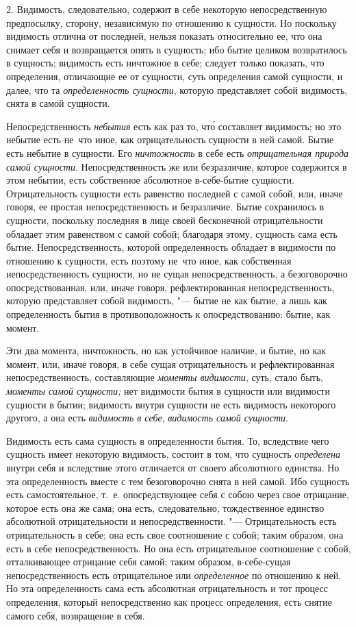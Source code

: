 2. Видимость, следовательно, содержит в себе некоторую непосредственную
предпосылку, сторону, независимую по отношению к сущности. Но поскольку
видимость отлична от последней, нельзя показать относительно ее, что она
снимает себя и возвращается опять в сущность; ибо бытие целиком
возвратилось в сущность; видимость есть ничтожное в себе; следует только
показать, что определения, отличающие ее от сущности, суть определения
самой сущности, и далее, что та {\em определенность
сущности}, которую представляет собой видимость, снята в самой сущности.

Непосредственность {\em небытия} есть как раз то, чт\'{о}
составляет видимость; но это небытие есть не~что иное, как отрицательность
сущности в ней самой. Бытие есть небытие в сущности. Его
{\em ничтожность} в себе есть
{\em отрицательная природа самой сущности}.
Непосредственность же или безразличие, которое содержится в этом небытии,
есть собственное абсолютное в-себе-бытие сущности. Отрицательность сущности
есть равенство последней с самой собой, или, иначе говоря, ее простая
непосредственность и безразличие. Бытие сохранилось в сущности, поскольку
последняя в лице своей бесконечной отрицательности обладает этим равенством
с самой собой; благодаря этому, сущность сама есть бытие.
Непосредственность, которой определенность обладает в видимости по
отношению к сущности, есть поэтому не~что иное, как собственная
непосредственность сущности, но не сущая непосредственность, а
безоговорочно опосредствованная, или, иначе говоря, рефлектированная
непосредственность, которую представляет собой видимость, "--- бытие не как
бытие, а лишь как определенность бытия в противоположность к
опосредствованию: бытие, как момент.

Эти два момента, ничтожность, но как устойчивое наличие, и бытие, но как
момент, или, иначе говоря, в себе сущая отрицательность и рефлектированная
непосредственность, составляющие {\em моменты
видимости}, суть, стало быть, {\em моменты самой
сущности;} нет видимости бытия в сущности или видимости сущности в бытии;
видимость внутри сущности не есть видимость некоторого другого, а она есть
{\em видимость в себе},
{\em видимость самой сущности}.

Видимость есть сама сущность в определенности бытия. То, вследствие чего
сущность имеет некоторую видимость, состоит в том, что сущность
{\em определена} внутри себя и вследствие этого
отличается от своего абсолютного единства. Но эта определенность вместе с
тем безоговорочно снята в ней самой. Ибо сущность есть самостоятельное,
т.~е. опосредствующее себя с собою через свое отрицание, которое есть она
же сама; она есть, следовательно, тождественное единство абсолютной
отрицательности и непосредственности. "--- Отрицательность есть
отрицательность в себе; она есть свое соотношение с собой; таким образом,
она есть в себе непосредственность. Но она есть отрицательное соотношение с
собой, отталкивающее отрицание себя самой; таким образом, в-себе-сущая
непосредственность есть отрицательное или
{\em определенное} по отношению к ней. Но эта
определенность сама есть абсолютная отрицательность и тот процесс
определения, который непосредственно как процесс определения, есть снятие
самого себя, возвращение в себя.

